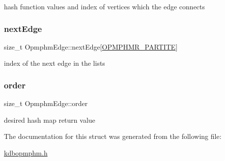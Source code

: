 hash function values and index of vertices which the edge connects \mbox{\label{structOpmphmEdge_add7672f7932f5e829a2228dc0d87606e}} 
\subsubsection{\texorpdfstring{next\+Edge}{nextEdge}}
{\footnotesize\ttfamily size\+\_\+t Opmphm\+Edge\+::next\+Edge\mbox{[}\hyperlink{kdbopmphm_8h_ad241eace4050c6fcdab0da1919a79d93}{O\+P\+M\+P\+H\+M\+R\+\_\+\+P\+A\+R\+T\+I\+TE}\mbox{]}}

index of the next edge in the lists \mbox{\label{structOpmphmEdge_a6e4538c7c7f5d72f8ecab6aca834e8c8}} 
\subsubsection{\texorpdfstring{order}{order}}
{\footnotesize\ttfamily size\+\_\+t Opmphm\+Edge\+::order}

desired hash map return value 

The documentation for this struct was generated from the following file\+:\begin{DoxyCompactItemize}
\item 
\hyperlink{kdbopmphm_8h}{kdbopmphm.\+h}\end{DoxyCompactItemize}

